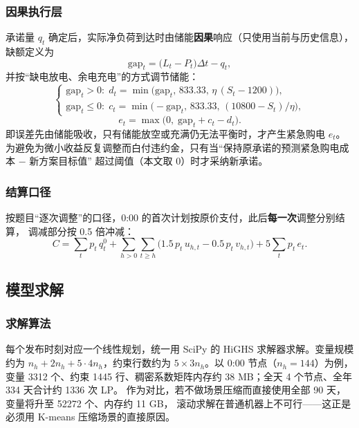\documentclass[12pt,a4paper]{article}
\begin{document}
\subsubsection{因果执行层}

承诺量 $q_t$ 确定后，实际净负荷到达时由储能\textbf{因果}响应（只使用当前与历史信息），缺额定义为
\begin{equation}
    \text{gap}_t = \big(L_t - P_t\big)\Delta t - q_t,
    \label{eq:q3_gap}
\end{equation}
并按“缺电放电、余电充电”的方式调节储能：
\begin{equation}
    \begin{cases}
        \text{gap}_t > 0:\; d_t = \min\big(\text{gap}_t,\, 833.33,\, \eta\,(S_t - 1200)\big), \\[2pt]
        \text{gap}_t \leq 0:\; c_t = \min\big(-\text{gap}_t,\, 833.33,\, (10800 - S_t)/\eta\big),
    \end{cases}
    \label{eq:q3_exec}
\end{equation}
\begin{equation}
    e_t = \max\big(0,\; \text{gap}_t + c_t - d_t\big).
    \label{eq:q3_exec_emg}
\end{equation}
即误差先由储能吸收，只有储能放空或充满仍无法平衡时，才产生紧急购电 $e_t$。
为避免为微小收益反复调整而白付违约金，只有当“保持原承诺的预测紧急购电成本 $-$ 新方案目标值”
超过阈值（本文取 0）时才采纳新承诺。

\subsubsection{结算口径}

按题目“逐次调整”的口径，0:00 的首次计划按原价支付，此后\textbf{每一次}调整分别结算，
调减部分按 0.5 倍冲减：
\begin{equation}
    C = \sum_{t} p_t\, q^{0}_{t}
      + \sum_{h>0} \sum_{t \geq h} \big(1.5\,p_t\,u_{h,t} - 0.5\,p_t\,v_{h,t}\big)
      + 5 \sum_{t} p_t\, e_t.
    \label{eq:q3_cost}
\end{equation}

\subsection{模型求解}

\subsubsection{求解算法}

每个发布时刻对应一个线性规划，统一用 SciPy 的 HiGHS 求解器求解。变量规模约为
$n_h + 2n_h + 5 \cdot 4n_h$，约束行数约为 $5 \times 3n_h$。以 0:00 节点（$n_h = 144$）为例，
变量 3312 个、约束 1445 行、稠密系数矩阵内存约 38 MB；全天 4 个节点、全年 334 天合计约 1336 次 LP。
作为对比，若不做场景压缩而直接使用全部 90 天，变量将升至 52272 个、内存约 11 GB，
滚动求解在普通机器上不可行——这正是必须用 K-means 压缩场景的直接原因。
\end{document}

